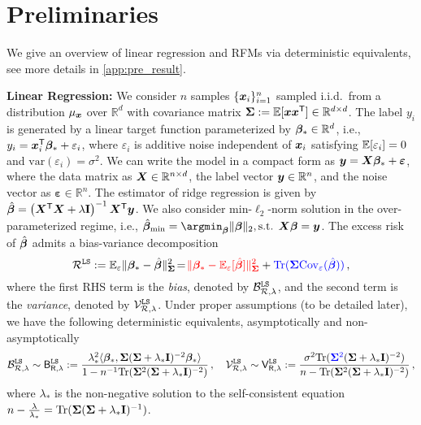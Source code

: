 \section{Preliminaries}\label{sec:preli}

We give an overview of linear regression and RFMs via deterministic equivalents, see more details in \cref{app:pre_result}.

{\bf Linear Regression:} 
We consider $n$ samples $\{ {\boldsymbol x}_i \}_{i=1}^n$ sampled i.i.d.\ from a distribution $\mu_{\boldsymbol x}$ over $\mathbb{R}^d$ with covariance matrix ${\boldsymbol \Sigma} := \mathbb{E}[{\boldsymbol x} {\boldsymbol x}^{\mathsf T}] \in \mathbb{R}^{d \times d}$.
The label $y_i$ is generated by a linear target function parameterized by ${\boldsymbol \beta}_\ast \in \mathbb{R}^d$, i.e., $y_i = {\boldsymbol x}_i^{\mathsf T} {\boldsymbol \beta}_\ast + \varepsilon_i$, where $\varepsilon_i$ is additive noise independent of ${\boldsymbol x}_i$ satisfying $\mathbb{E}[\varepsilon_i] = 0$ and $\text{var}(\varepsilon_i) = \sigma^2$.
We can write the model in a compact form as ${\boldsymbol y} = {\boldsymbol X} {\boldsymbol \beta}_\ast + \bm{\varepsilon}$, where the data matrix as ${\boldsymbol X} \in \mathbb{R}^{n \times d}$, the label vector ${\boldsymbol y} \in \mathbb{R}^n$, and the noise vector as $\bm \varepsilon \in \mathbb{R}^n$.
The estimator of ridge regression is given by $\hat{{\boldsymbol \beta}} = \left( {\boldsymbol X}^{\mathsf T} {\boldsymbol X} + \lambda {\mathbf I} \right)^{-1} {\boldsymbol X}^{\mathsf T} {\boldsymbol y}$.
We also consider min-$\ell_2$-norm solution in the over-parameterized regime, i.e., $\hat{\bbeta}_{\min} = \argmin_{\bbeta} \| \bbeta \|_2, \text{s.t. } \bX \bbeta = \by $.
The excess risk of $\hat{{\boldsymbol \beta}}$ admits a bias-variance decomposition
\[
    \mathcal{R}^{\tt LS} := \mathbb{E}_{\varepsilon}\|{\boldsymbol \beta}_* - \hat{{\boldsymbol \beta}}\|_{{\boldsymbol \Sigma}}^2 \!=\! {\color{red}\|{\boldsymbol \beta}_* - \mathbb{E}_{\varepsilon}[\hat{{\boldsymbol \beta}}]\|_{{\boldsymbol \Sigma}}^2} +  {\color{blue}{\rm Tr}({\boldsymbol \Sigma} \mathrm{Cov}_{\varepsilon}(\hat{{\boldsymbol \beta}}))}\,,
\]
where the first RHS term is the {\color{red}\emph{bias}}, denoted by  $\mathcal{B}^{\tt LS}_{\mathcal{R},\lambda}$, and the second term is the {\color{blue}\emph{variance}}, denoted by $\mathcal{V}^{\tt LS}_{\mathcal{R},\lambda}$.
Under proper assumptions (to be detailed later), we have the following deterministic equivalents, asymptotically \citep{bach2024high} and non-asymptotically \citep{cheng2022dimension}
\begin{equation}\label{eq:de_risk}
       \mathcal{B}^{\tt LS}_{\mathcal{R},\lambda} \sim \mathsf B^{\tt LS}_{\mathsf R,\lambda} := \frac{\lambda_*^2\langle{\boldsymbol \beta}_*,{\boldsymbol \Sigma}({\boldsymbol \Sigma}+\lambda_*{\mathbf I})^{-2}{\boldsymbol \beta}_*\rangle}{1-n^{-1}{\rm Tr}({\boldsymbol \Sigma}^2({\boldsymbol \Sigma}+\lambda_*{\mathbf I})^{-2})}\,, \quad \mathcal{V}^{\tt LS}_{\mathcal{R},\lambda} \sim  \mathsf V^{\tt LS}_{\mathsf R,\lambda} := \frac{\sigma^2{\rm Tr}({\color{blue}{\boldsymbol \Sigma}^2}({\boldsymbol \Sigma}+\lambda_*{\mathbf I})^{-2})}{n-{\rm Tr}({\boldsymbol \Sigma}^2({\boldsymbol \Sigma}+\lambda_*{\mathbf I})^{-2})}\,,
\end{equation}
where $\lambda_*$ is the non-negative solution to the self-consistent equation $n - \frac{\lambda}{\lambda_*} = {\rm Tr} ( {\boldsymbol \Sigma} ( {\boldsymbol \Sigma} + \lambda_*{\mathbf I} )^{-1} )$.

